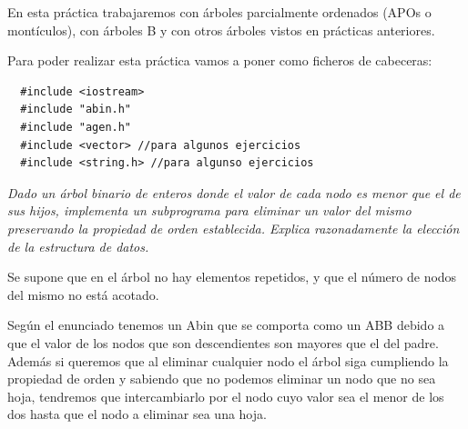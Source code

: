 En esta práctica trabajaremos con árboles parcialmente ordenados (APOs o montículos), con árboles B y con otros árboles vistos en prácticas anteriores.

Para poder realizar esta práctica vamos a poner como ficheros de cabeceras:
\begin{verbatim}
  #include <iostream>
  #include "abin.h"
  #include "agen.h"
  #include <vector> //para algunos ejercicios
  #include <string.h> //para algunso ejercicios
\end{verbatim}

\textbf{\large{}}\textit{ Dado un árbol binario de enteros donde el valor de cada nodo es menor que el de sus hijos, implementa un subprograma para eliminar un valor del mismo preservando la propiedad de orden establecida. Explica razonadamente la elección de la estructura de datos.}

 Se supone que en el árbol no hay elementos repetidos, y que el número de nodos del mismo no está acotado.

Según el enunciado tenemos un Abin que se comporta como un ABB debido a que el valor de los nodos que son descendientes son mayores que el del padre.
Además si queremos que al eliminar cualquier nodo el árbol siga cumpliendo la propiedad de orden y sabiendo que no podemos eliminar un nodo que no sea hoja, tendremos que intercambiarlo por el nodo cuyo valor sea el menor de los dos hasta que el nodo a eliminar sea una hoja.

